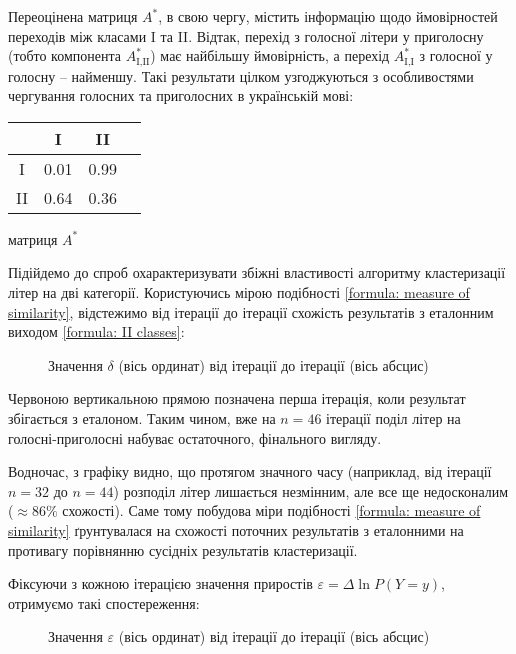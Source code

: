 Переоцінена матриця $A^*$, в свою чергу, містить інформацію щодо ймовірностей переходів між класами I та II. Відтак, перехід з голосної літери у приголосну (тобто компонента $A_{\text{I,II}}^*$) має найбільшу ймовірність, а перехід $A_{\text{I,I}}^*$ з голосної у голосну -- найменшу. Такі результати цілком узгоджуються з особливостями чергування голосних та приголосних в українській мові:

\vspace{0.4cm}
\begin{table}[H]
    \begin{center}
        \begin{tabular}{c|ccc}
            & I & II \\
            \hline
            I & 0.01 & 0.99 \\
            II & 0.64 & 0.36 \\
        \end{tabular}
    \end{center} \centering матриця $A^*$
\end{table}

\vspace{0.4cm}
Підійдемо до спроб охарактеризувати збіжні властивості алгоритму кластеризації літер на дві категорії. Користуючись мірою подібності \eqref{formula: measure of similarity}, відстежимо від ітерації до ітерації схожість результатів з еталонним виходом \eqref{formula: II classes}:
\subfiguresbegin
\begin{figure}[H]
    \vspace{-0.5cm}
    \caption{\label{first} Значення $\delta$ (вісь ординат) від ітерації до ітерації (вісь абсцис)}
    \label{figure: II delta}
\end{figure}

Червоною вертикальною прямою позначена перша ітерація, коли результат збігається з еталоном. Таким чином, вже на $n=46$ ітерації поділ літер на голосні-приголосні набуває остаточного, фінального вигляду. 

Водночас, з графіку видно, що протягом значного часу (наприклад, від ітерації $n=32$ до $n=44$) розподіл літер лишається незмінним, але все ще недосконалим ($\approx 86\%$ схожості). Саме тому побудова міри подібності \eqref{formula: measure of similarity} ґрунтувалася на схожості поточних результатів з еталонними на противагу порівнянню сусідніх результатів кластеризації. 

Фіксуючи з кожною ітерацією значення приростів $\varepsilon=\Delta\ln P(Y=y)$, отримуємо такі спостереження:
\begin{figure}[H]
    \vspace{-0.8cm}
    \caption{\label{second} Значення $\varepsilon$ (вісь ординат) від ітерації до ітерації (вісь абсцис)}
    \label{figure: II epsilon}
\end{figure}
\subfiguresend

